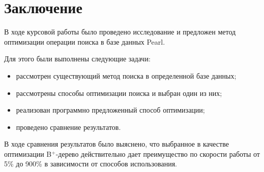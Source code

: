 \chapter*{Заключение}

В ходе курсовой работы было проведено исследование и предложен метод оптимизации операции поиска в базе данных Pearl.

Для этого были выполнены следующие задачи:
\begin{itemize}
    \item рассмотрен существующий метод поиска в определенной базе данных;
    \item рассмотрены способы оптимизации поиска и выбран один из них;
    \item реализован программно предложенный способ оптимизации;
    \item проведено сравнение результатов.
\end{itemize}

В ходе сравнения результатов было выяснено, что выбранное в качестве оптимизации B$^+$-дерево действительно дает преимущество по скорости работы от 5\% до 900\% в зависимости от способов использования.
